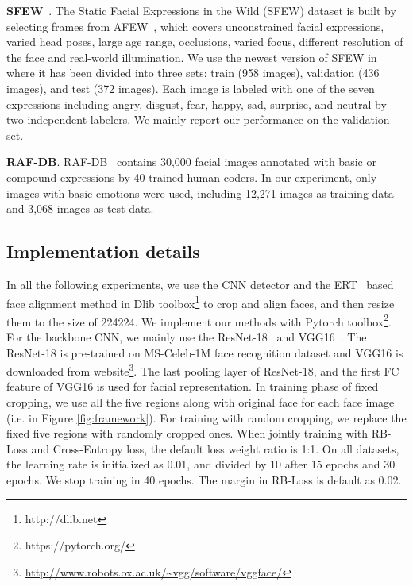 \documentclass[journal]{IEEEtran}
\newcommand{\peng}[1]{\textcolor[rgb]{0,0,0}{#1}}
\begin{document}
\textbf{SFEW}~\cite{6130508}. The Static Facial Expressions in the Wild (SFEW) dataset is built by selecting frames from AFEW~\cite{dhall2012collecting}, which covers unconstrained facial expressions, varied head poses, large age range, occlusions, varied focus, different resolution of the face and real-world illumination. {We use the newest version of SFEW in \cite{dhall2015video} where it has been divided into three sets: train (958 images), validation (436 images), and test (372 images).} Each image is labeled with one of the seven expressions including angry, disgust, fear, happy, sad, surprise, and neutral by two independent labelers. We mainly report our performance on the validation set.

\peng{\textbf{RAF-DB}. RAF-DB~\cite{8453893} contains 30,000 facial images annotated with basic or compound expressions by 40 trained human coders. In our experiment, only images with basic emotions were used, including 12,271 images as training data and 3,068 images as test data.}

\subsection{Implementation details}
{In all the following experiments, we use the CNN detector and the ERT~\cite{kazemi2014one} based face alignment method in Dlib toolbox\footnote{http://dlib.net} to crop and align faces, and then resize them to the size of 224224.
We implement our methods with Pytorch toolbox\footnote{https://pytorch.org/}.
For the backbone CNN, we mainly use the ResNet-18~\cite{he2016deep} and VGG16~\cite{Parkhi15}. The ResNet-18 is pre-trained on MS-Celeb-1M face recognition dataset and VGG16 is downloaded from website\footnote{\url{http://www.robots.ox.ac.uk/~vgg/software/vggface/}}.
The last pooling layer of ResNet-18, and the first FC feature of VGG16 is used for facial representation.
In training phase of fixed cropping, we use all the five regions along with original face for each face image (i.e.  in Figure \ref{fig:framework}). For training with random cropping, we replace the fixed five regions with randomly cropped ones.
When jointly training with RB-Loss and Cross-Entropy loss, the default loss weight ratio is 1:1. On all datasets, the learning rate is initialized as 0.01, and divided by 10 after 15 epochs and 30 epochs. We stop training in 40 epochs.
The margin in RB-Loss is default as 0.02.}
\end{document}
